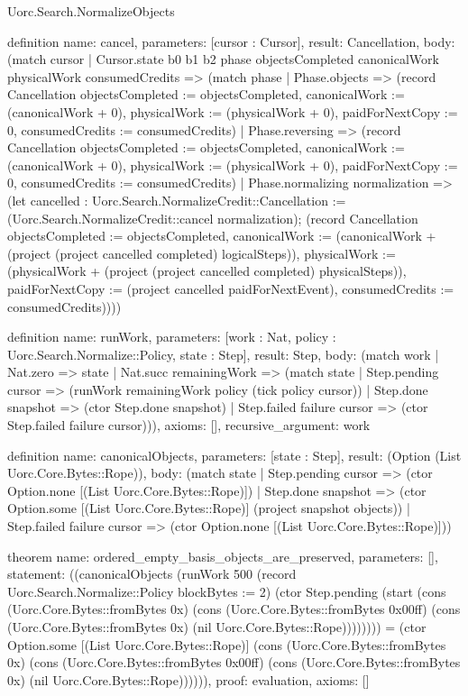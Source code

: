 \begin{lexlean}{Uorc.Search.NormalizeObjects}
\begin{semanticmodule}
definition{
  name: cancel,
  parameters: [cursor : Cursor],
  result: Cancellation,
  body: (match cursor
    | Cursor.state b0 b1 b2 phase objectsCompleted canonicalWork physicalWork consumedCredits => (match phase
      | Phase.objects => (record Cancellation {objectsCompleted := objectsCompleted, canonicalWork := (canonicalWork + 0), physicalWork := (physicalWork + 0), paidForNextCopy := 0, consumedCredits := consumedCredits})
      | Phase.reversing => (record Cancellation {objectsCompleted := objectsCompleted, canonicalWork := (canonicalWork + 0), physicalWork := (physicalWork + 0), paidForNextCopy := 0, consumedCredits := consumedCredits})
      | Phase.normalizing normalization => (let cancelled : Uorc.Search.NormalizeCredit::Cancellation := (Uorc.Search.NormalizeCredit::cancel normalization); (record Cancellation {objectsCompleted := objectsCompleted, canonicalWork := (canonicalWork + (project (project cancelled completed) logicalSteps)), physicalWork := (physicalWork + (project (project cancelled completed) physicalSteps)), paidForNextCopy := (project cancelled paidForNextEvent), consumedCredits := consumedCredits}))))
}

definition{
  name: runWork,
  parameters: [work : Nat, policy : Uorc.Search.Normalize::Policy, state : Step],
  result: Step,
  body: (match work
    | Nat.zero => state
    | Nat.succ remainingWork => (match state
      | Step.pending cursor => (runWork remainingWork policy (tick policy cursor))
      | Step.done snapshot => (ctor Step.done snapshot)
      | Step.failed failure cursor => (ctor Step.failed failure cursor))),
  axioms: [],
  recursive_argument: work
}

definition{
  name: canonicalObjects,
  parameters: [state : Step],
  result: (Option (List Uorc.Core.Bytes::Rope)),
  body: (match state
    | Step.pending cursor => (ctor Option.none [(List Uorc.Core.Bytes::Rope)])
    | Step.done snapshot => (ctor Option.some [(List Uorc.Core.Bytes::Rope)] (project snapshot objects))
    | Step.failed failure cursor => (ctor Option.none [(List Uorc.Core.Bytes::Rope)]))
}

theorem{
  name: ordered_empty_basis_objects_are_preserved,
  parameters: [],
  statement: ((canonicalObjects (runWork 500 (record Uorc.Search.Normalize::Policy {blockBytes := 2}) (ctor Step.pending (start (cons (Uorc.Core.Bytes::fromBytes 0x) (cons (Uorc.Core.Bytes::fromBytes 0x00ff) (cons (Uorc.Core.Bytes::fromBytes 0x) (nil Uorc.Core.Bytes::Rope)))))))) = (ctor Option.some [(List Uorc.Core.Bytes::Rope)] (cons (Uorc.Core.Bytes::fromBytes 0x) (cons (Uorc.Core.Bytes::fromBytes 0x00ff) (cons (Uorc.Core.Bytes::fromBytes 0x) (nil Uorc.Core.Bytes::Rope)))))),
  proof: evaluation{},
  axioms: []
}


\end{semanticmodule}
\end{lexlean}
